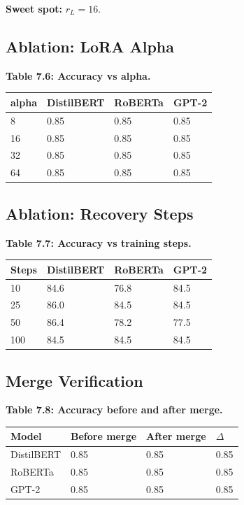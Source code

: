 \textbf{Sweet spot:} $r_L = 16$.

\subsection{Ablation: LoRA Alpha}

\textbf{Table 7.6: Accuracy vs alpha.}

\begin{table}[H]
\centering
\small
\begin{tabular}{llll}
\toprule
\textbf{alpha} & \textbf{DistilBERT} & \textbf{RoBERTa} & \textbf{GPT-2} \\
\midrule
8 & 0.85 & 0.85 & 0.85 \\
16 & 0.85 & 0.85 & 0.85 \\
32 & 0.85 & 0.85 & 0.85 \\
64 & 0.85 & 0.85 & 0.85 \\
\bottomrule
\end{tabular}
\end{table}

\subsection{Ablation: Recovery Steps}

\textbf{Table 7.7: Accuracy vs training steps.}

\begin{table}[H]
\centering
\small
\begin{tabular}{llll}
\toprule
\textbf{Steps} & \textbf{DistilBERT} & \textbf{RoBERTa} & \textbf{GPT-2} \\
\midrule
10 & 84.6 & 76.8 & 84.5 \\
25 & 86.0 & 84.5 & 84.5 \\
50 & 86.4 & 78.2 & 77.5 \\
100 & 84.5 & 84.5 & 84.5 \\
\bottomrule
\end{tabular}
\end{table}

\subsection{Merge Verification}

\textbf{Table 7.8: Accuracy before and after merge.}

\begin{table}[H]
\centering
\small
\begin{tabular}{llll}
\toprule
\textbf{Model} & \textbf{Before merge} & \textbf{After merge} & \textbf{$\Delta$} \\
\midrule
DistilBERT & 0.85 & 0.85 & 0.85 \\
RoBERTa & 0.85 & 0.85 & 0.85 \\
GPT-2 & 0.85 & 0.85 & 0.85 \\
\bottomrule
\end{tabular}
\end{table}

